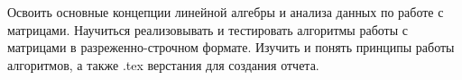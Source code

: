 Освоить основные концепции линейной алгебры и анализа данных по работе с матрицами. Научиться реализовывать и тестировать алгоритмы работы с матрицами в разреженно-строчном формате. Изучить и понять принципы работы алгоритмов, а также .tex верстания для создания отчета.

